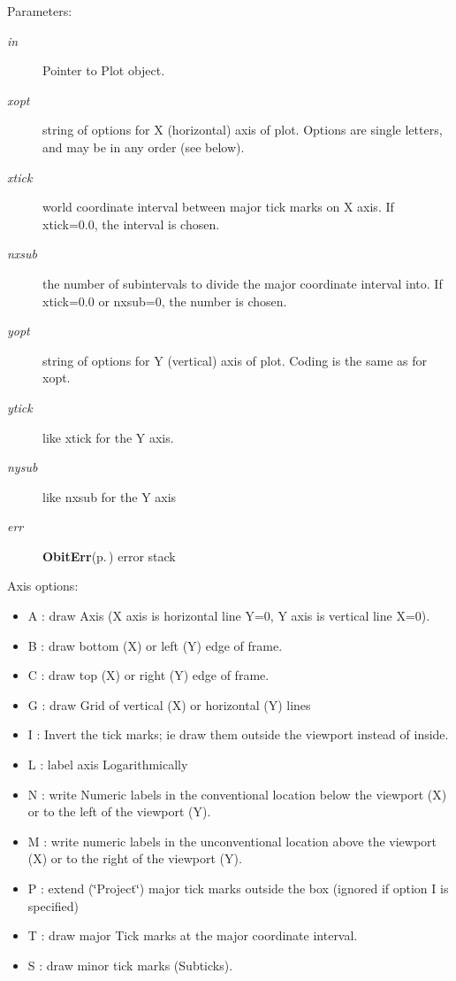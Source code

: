 \begin{Desc}
\item[Parameters:]
\begin{description}
\item[{\em in}]Pointer to Plot object. \item[{\em xopt}]string of options for X (horizontal) axis of plot. Options are single letters, and may be in any order (see below). \item[{\em xtick}]world coordinate interval between major tick marks on X axis. If xtick=0.0, the interval is chosen. \item[{\em nxsub}]the number of subintervals to divide the major coordinate interval into. If xtick=0.0 or nxsub=0, the number is chosen. \item[{\em yopt}]string of options for Y (vertical) axis of plot. Coding is the same as for xopt. \item[{\em ytick}]like xtick for the Y axis. \item[{\em nysub}]like nxsub for the Y axis \item[{\em err}]{\bf Obit\-Err}{\rm (p.\,\pageref{structObitErr})} error stack\end{description}
\end{Desc}
Axis options: \begin{itemize}
\item A : draw Axis (X axis is horizontal line Y=0, Y axis is vertical line X=0). \item B : draw bottom (X) or left (Y) edge of frame. \item C : draw top (X) or right (Y) edge of frame. \item G : draw Grid of vertical (X) or horizontal (Y) lines \item I : Invert the tick marks; ie draw them outside the viewport instead of inside. \item L : label axis Logarithmically \item N : write Numeric labels in the conventional location below the viewport (X) or to the left of the viewport (Y). \item M : write numeric labels in the unconventional location above the viewport (X) or to the right of the viewport (Y). \item P : extend (\char`\"{}Project\char`\"{}) major tick marks outside the box (ignored if option I is specified) \item T : draw major Tick marks at the major coordinate interval. \item S : draw minor tick marks (Subticks). \end{itemize}
